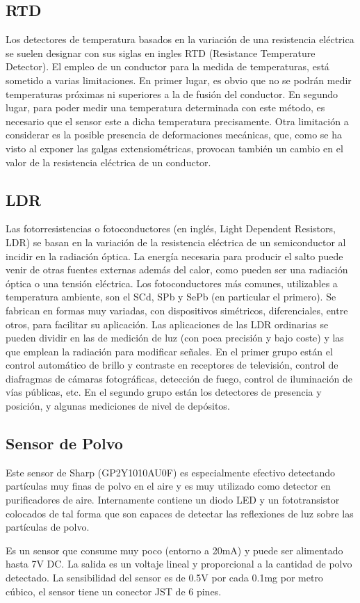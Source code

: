 \subsection{RTD}
Los detectores de temperatura basados en la variación de una resistencia eléctrica se suelen designar con sus siglas en ingles RTD (Resistance Temperature Detector).
El empleo de un conductor para la medida de temperaturas, está sometido a varias limitaciones. En primer lugar, es obvio que no se podrán medir temperaturas próximas ni superiores a la de fusión del conductor. En segundo lugar, para poder medir una temperatura determinada con este método, es necesario que el sensor este a dicha temperatura precisamente. Otra limitación a considerar es la posible presencia de deformaciones mecánicas, que, como se ha visto al exponer las galgas extensiométricas, provocan también un cambio en el valor de la resistencia eléctrica de un conductor.
\subsection{LDR}
Las fotorresistencias o fotoconductores (en inglés, Light Dependent Resistors, LDR) se basan en la variación de la resistencia eléctrica de un semiconductor al incidir en la radiación óptica.
La energía necesaria para producir el salto puede venir de otras fuentes externas además del calor, como pueden ser una radiación óptica o una tensión eléctrica. Los fotoconductores más comunes, utilizables a temperatura ambiente, son el SCd, SPb y SePb (en particular el primero). Se fabrican en formas muy variadas, con dispositivos simétricos, diferenciales, entre otros, para facilitar su aplicación. Las aplicaciones de las LDR ordinarias se pueden dividir en las de medición de luz (con poca precisión y bajo coste) y las que emplean la radiación para modificar señales. En el primer grupo están el control automático de brillo y contraste en receptores de televisión, control de diafragmas de cámaras fotográficas, detección de fuego, control de iluminación de vías públicas, etc. En el segundo grupo están los detectores de presencia y posición, y algunas mediciones de nivel de depósitos.
\subsection{Sensor de Polvo}
Este sensor de Sharp (GP2Y1010AU0F) es especialmente efectivo detectando partículas muy finas de polvo en el aire y es muy utilizado como detector en purificadores de aire. Internamente contiene un diodo LED y un fototransistor colocados de tal forma que son capaces de detectar las reflexiones de luz sobre las partículas de polvo.

Es un sensor que consume muy poco (entorno a 20mA) y puede ser alimentado hasta 7V DC. La salida es un voltaje lineal y proporcional a la cantidad de polvo detectado. La sensibilidad del sensor es de 0.5V por cada 0.1mg por metro cúbico, el sensor tiene un conector JST de 6 pines.


